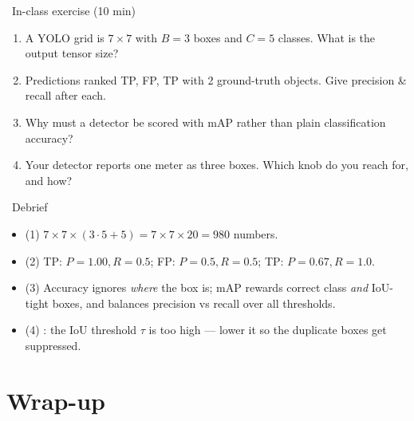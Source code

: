 \documentclass[10pt,aspectratio=169]{beamer}
\begin{document}
\begin{frame}{\faPen~In-class exercise (10 min)}
  \begin{infobox}
  \end{infobox}
  \begin{enumerate}
    \item A YOLO grid is $7\times7$ with $B{=}3$ boxes and $C{=}5$ classes. What is the output tensor size?
    \item Predictions ranked TP, FP, TP with 2 ground-truth objects. Give precision \& recall after each.
    \item Why must a detector be scored with mAP rather than plain classification accuracy?
    \item Your detector reports one meter as three boxes. Which knob do you reach for, and how?
  \end{enumerate}
\end{frame}

\begin{frame}{\faPen~Debrief}
  \begin{itemize}
    \item (1) $7\times7\times(3\cdot5+5)=7\times7\times20=980$ numbers.
    \item (2) TP: $P{=}1.00,R{=}0.5$; FP: $P{=}0.5,R{=}0.5$; TP: $P{=}0.67,R{=}1.0$.
    \item (3) Accuracy ignores \emph{where} the box is; mAP rewards correct class \emph{and} IoU-tight boxes, and balances precision vs recall over all thresholds.
    \item (4) : the IoU threshold $\tau$ is too high --- lower it so the duplicate boxes get suppressed.
  \end{itemize}
\end{frame}

\section{Wrap-up}
\end{document}
